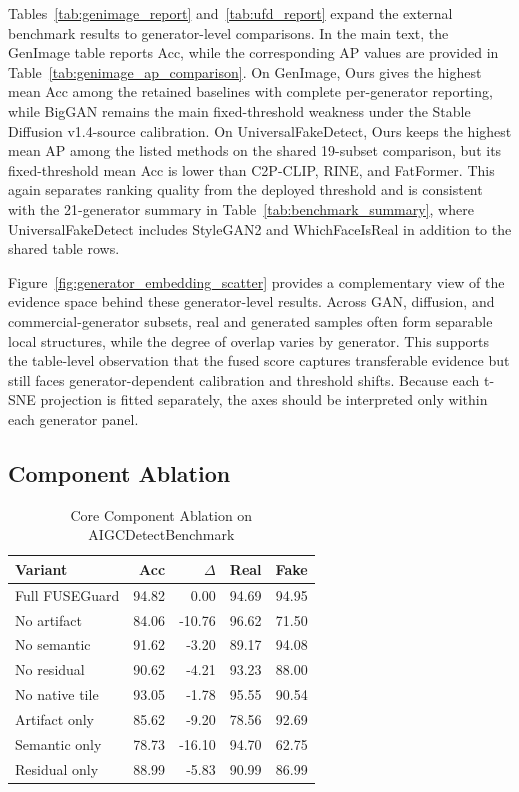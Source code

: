\documentclass[lettersize,journal]{IEEEtran}
\begin{document}
\clearpage

Tables~\ref{tab:genimage_report} and~\ref{tab:ufd_report} expand the external benchmark results to generator-level comparisons. In the main text, the GenImage table reports Acc, while the corresponding AP values are provided in Table~\ref{tab:genimage_ap_comparison}. On GenImage, Ours gives the highest mean Acc among the retained baselines with complete per-generator reporting, while BigGAN remains the main fixed-threshold weakness under the Stable Diffusion v1.4-source calibration. On UniversalFakeDetect, Ours keeps the highest mean AP among the listed methods on the shared 19-subset comparison, but its fixed-threshold mean Acc is lower than C2P-CLIP, RINE, and FatFormer. This again separates ranking quality from the deployed threshold and is consistent with the 21-generator summary in Table~\ref{tab:benchmark_summary}, where UniversalFakeDetect includes StyleGAN2 and WhichFaceIsReal in addition to the shared table rows.

Figure~\ref{fig:generator_embedding_scatter} provides a complementary view of the evidence space behind these generator-level results. Across GAN, diffusion, and commercial-generator subsets, real and generated samples often form separable local structures, while the degree of overlap varies by generator. This supports the table-level observation that the fused score captures transferable evidence but still faces generator-dependent calibration and threshold shifts. Because each t-SNE projection is fitted separately, the axes should be interpreted only within each generator panel.

\subsection{Component Ablation}
\label{sec:ablation_study}

\begin{table}[t]
\caption{Core Component Ablation on AIGCDetectBenchmark}
\label{tab:prior_ablation}
\centering
\small
\renewcommand{\arraystretch}{1.08}
\setlength{\tabcolsep}{4pt}
\begin{tabular}{lrrrr}
\toprule
Variant & Acc & $\Delta$ & Real & Fake \\
\midrule
Full FUSEGuard & 94.82 & 0.00 & 94.69 & 94.95 \\
No artifact & 84.06 & -10.76 & 96.62 & 71.50 \\
No semantic & 91.62 & -3.20 & 89.17 & 94.08 \\
No residual & 90.62 & -4.21 & 93.23 & 88.00 \\
No native tile & 93.05 & -1.78 & 95.55 & 90.54 \\
\midrule
Artifact only & 85.62 & -9.20 & 78.56 & 92.69 \\
Semantic only & 78.73 & -16.10 & 94.70 & 62.75 \\
Residual only & 88.99 & -5.83 & 90.99 & 86.99 \\
\bottomrule
\end{tabular}
\end{table}
\end{document}
